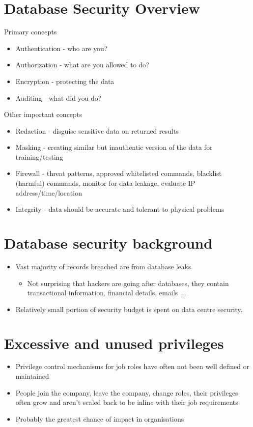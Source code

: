 \documentclass{article}[18pt]
\begin{document}
\section{Database Security Overview}
Primary concepts
\begin{itemize}
	\item Authentication - who are you?
	\item Authorization - what are you allowed to do?
	\item Encryption - protecting the data
	\item Auditing - what did you do?
\end{itemize}
Other important concepts
\begin{itemize}
	\item Redaction - disguise sensitive data on returned results
	\item Masking - creating similar but inauthentic version of the data for training/testing
	\item Firewall - threat patterns, approved whitelisted commands, blacklist (harmful) commands, monitor for data leakage, evaluate IP address/time/location
	\item Integrity - data should be accurate and tolerant to physical problems
\end{itemize}
\section{Database security background}
\begin{itemize}
	\item Vast majority of records breached are from database leaks
	\begin{itemize}
		\item Not surprising that hackers are going after databases, they contain transactional information, financial details, emails ...
	\end{itemize}
	\item Relatively small portion of security budget is spent on data centre security.
\end{itemize}
\section{Excessive and unused privileges}
\begin{itemize}
	\item Privilege control mechanisms for job roles have often not been well defined or maintained
	\item People join the company, leave the company, change roles, their privileges often grow and aren't scaled back to be inline with their job requirements
	\item Probably the greatest chance of impact in organisations
\end{itemize}
\end{document}
